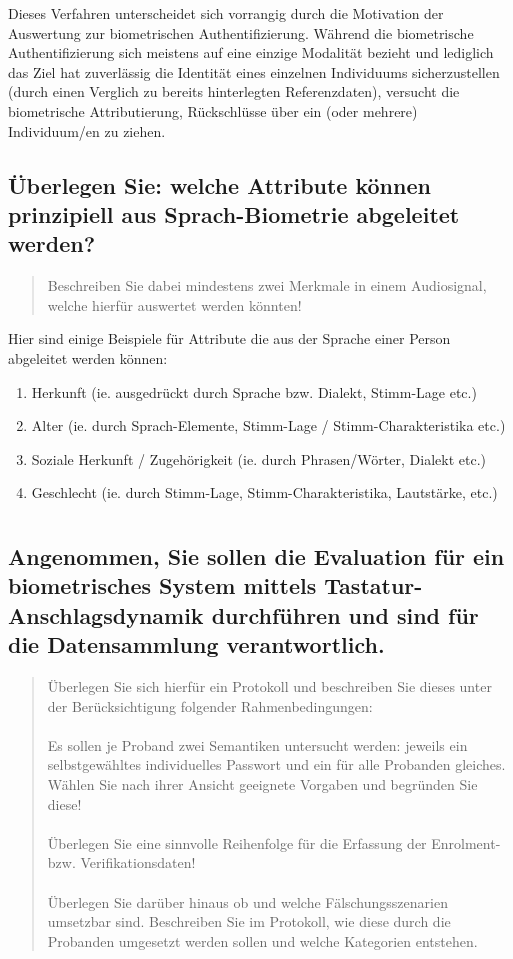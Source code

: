 \documentclass{article}
\newcommand{\annotation}[1]{
    \begin{quote}
    	\begin{textit}{#1}\end{textit}
    \end{quote}
}
\begin{document}
Dieses Verfahren unterscheidet sich vorrangig durch die Motivation der Auswertung zur biometrischen Authentifizierung. 
Während die biometrische Authentifizierung sich meistens auf eine einzige Modalität bezieht und lediglich das Ziel hat
zuverlässig die Identität eines einzelnen Individuums sicherzustellen (durch einen Verglich zu bereits hinterlegten 
Referenzdaten), versucht die biometrische Attributierung, Rückschlüsse über ein (oder mehrere) Individuum/en zu ziehen.

\subsection{Überlegen Sie: welche Attribute können prinzipiell aus Sprach-Biometrie abgeleitet werden?}

\annotation{Beschreiben Sie dabei mindestens zwei Merkmale in einem Audiosignal, welche hierfür auswertet werden könnten!}

Hier sind einige Beispiele für Attribute die aus der Sprache einer Person abgeleitet werden können:

\begin{enumerate}
	\item Herkunft (ie. ausgedrückt durch Sprache bzw. Dialekt, Stimm-Lage etc.)
	\item Alter (ie. durch Sprach-Elemente, Stimm-Lage / Stimm-Charakteristika etc.)
	\item Soziale Herkunft / Zugehörigkeit (ie. durch Phrasen/Wörter, Dialekt etc.)
	\item Geschlecht (ie. durch Stimm-Lage, Stimm-Charakteristika, Lautstärke, etc.)
\end{enumerate}

\section{}

\subsection{Angenommen, Sie sollen die Evaluation für ein biometrisches System mittels Tastatur-Anschlagsdynamik durchführen und sind für die Datensammlung verantwortlich.}

\annotation{Überlegen Sie sich hierfür ein Protokoll und beschreiben
	Sie dieses unter der Berücksichtigung folgender Rahmenbedingungen:\\\\
	Es sollen je Proband zwei Semantiken untersucht werden: jeweils ein
	selbstgewähltes individuelles Passwort und ein für alle Probanden gleiches.
	Wählen Sie nach ihrer Ansicht geeignete Vorgaben und begründen Sie diese!\\\\
	Überlegen Sie eine sinnvolle Reihenfolge für die Erfassung der Enrolment-
	bzw. Verifikationsdaten!\\\\
	Überlegen Sie darüber hinaus ob und welche Fälschungsszenarien umsetzbar sind.
	Beschreiben Sie im Protokoll, wie diese durch die Probanden umgesetzt werden
	sollen und welche Kategorien entstehen.
}
\end{document}
